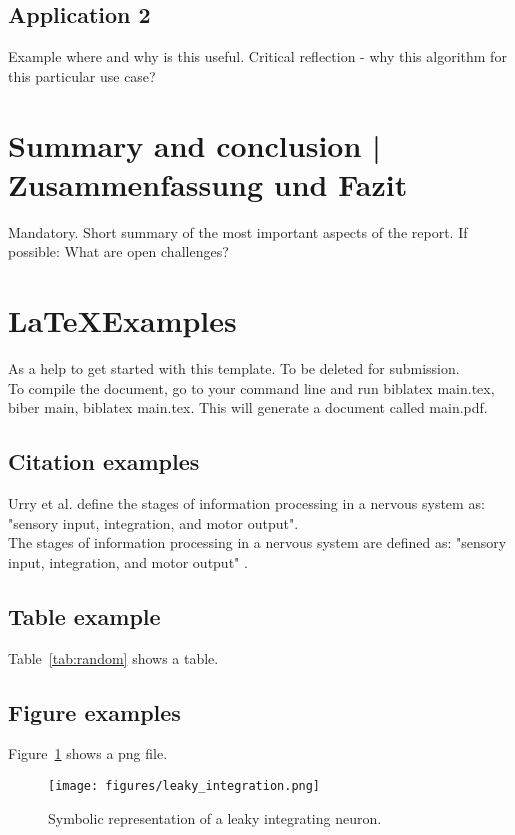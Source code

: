 \subsection{Application 2}
Example where and why is this useful. Critical reflection - why this algorithm for this particular use case?


\section{Summary and conclusion | Zusammenfassung und Fazit}
Mandatory. Short summary of the most important aspects of the report.
If possible: What are open challenges?


\newpage
\section{\LaTeX Examples}
As a help to get started with this template. To be deleted for submission.\\
To compile the document, go to your command line and run biblatex main.tex, biber main, biblatex main.tex. This will generate a document called main.pdf.

\subsection{Citation examples}
Urry et al. \cite{campbell:2017} define the stages of information processing in a nervous system as: "sensory input, integration, and motor output". \\
The stages of information processing in a nervous system are defined as: "sensory input, integration, and motor output" \cite{campbell:2017}. 


\subsection{Table example}
Table~\ref{tab:random} shows a table.



\subsection{Figure examples}
Figure~\ref{fig:leaky_integration} shows a png file.
\begin{figure}[htbp]
    \centering
    \texttt{[image: figures/leaky\_integration.png]}
    \caption{Symbolic representation of a leaky integrating neuron.}
    \label{fig:leaky_integration}
\end{figure}



